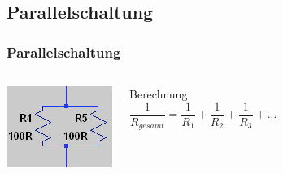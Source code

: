\subsection{Parallelschaltung}
\begin{frame}
  \frametitle{Parallelschaltung}
  \begin{columns}
    \begin{center}
      \includegraphics[width=.8\textwidth]{e04/Parallel.png}\footnotemark
    \end{center}
    \pause
    \begin{block}{Berechnung}
      $$\frac{1}{R_{gesamt}} = \frac{1}{R_1} + \frac{1}{R_2} + \frac{1}{R_3} + ...$$
    \end{block}
  \end{columns}
\end{frame}

